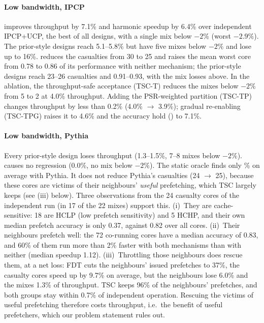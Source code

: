 \paragraph{Low bandwidth, IPCP}
\vthree{} improves throughput by 7.1\% and harmonic speedup by 6.4\% over independent IPCP+UCP, the best of all
designs, with a single mix below $-2\%$ (worst $-2.9\%$).  The prior-style designs reach 5.1--5.8\% but have five mixes
below $-2\%$ and lose up to 16\%.  \vthree{} reduces the casualties from 30 to 25 and raises the mean worst core from
0.78 to 0.86 of its performance with neither mechanism; the prior-style designs reach 23--26 casualties and
0.91--0.93, with the mix losses above.  In the ablation, the throughput-safe acceptance (TSC-T) reduces the mixes
below $-2\%$ from 5 to 2 at 4.0\% throughput.  Adding the PSR-weighted partition (TSC-TP) changes throughput by
less than 0.2\% (4.0\% $\to$ 3.9\%); gradual re-enabling (TSC-TPG) raises it to 4.6\% and the accuracy hold
(\vthree) to 7.1\%.

\paragraph{Low bandwidth, Pythia}
Every prior-style design loses throughput (1.3--1.5\%, 7--8 mixes below $-2\%$).  \vthree{} causes no regression
(0.0\%, no mix below $-2\%$).  The static oracle finds only \OrcPyMean\% on average with Pythia.  It does not reduce Pythia's casualties (24 $\to$ 25), because these cores are victims of their neighbours'
\emph{useful} prefetching, which TSC largely keeps (see (iii) below).  Three observations from the 24 casualty cores of
the independent run (in 17 of the 22 mixes) support this.  (i)~They are cache-sensitive: 18 are HCLP (low prefetch sensitivity) and 5 HCHP, and their own median prefetch accuracy is only 0.37, against 0.82 over all
cores.  (ii)~Their neighbours prefetch well: the 72 co-running cores have a median accuracy of 0.83, and 60\% of them
run more than 2\% faster with both mechanisms than with neither (median speedup 1.12).  (iii)~Throttling those neighbours
does rescue them, at a net loss: FDT cuts the neighbours' issued prefetches to 37\%, the casualty cores speed up by
9.7\% on average, but the neighbours lose 6.0\% and the mixes 1.3\% of throughput.  TSC keeps 96\% of the
neighbours' prefetches, and both groups stay within 0.7\% of independent operation.  Rescuing the victims of useful
prefetching therefore costs throughput, i.e.\ the benefit of useful prefetchers, which our problem statement rules out.

